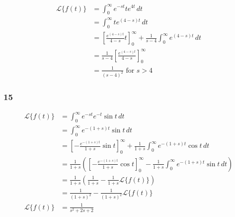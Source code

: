 \documentclass{article}
\begin{document}
\begin{align*}
  \mathcal{L}\{f(t)\} & = \int_0^\infty e^{-s t} t e^{4 t} \,dt                                                                    \\
                      & = \int_0^\infty t e^{(4 - s) t} \,dt                                                                       \\
                      & = \left[ \frac{e^{(4 - s) t}}{4 - s} t \right]_0^\infty + \frac{1}{s - 4} \int_0^\infty e^{(4 - s) t} \,dt \\
                      & = \frac{1}{s - 4} \left[ \frac{e^{(4 - s) t}}{4 - s} \right]_0^\infty                                      \\
                      & = \frac{1}{(s - 4)^2} \text{ for } s > 4
\end{align*}

\subsubsection{15}

\begin{align*}
  \mathcal{L}\{f(t)\} & = \int_0^\infty e^{-s t} e^{-t} \sin t \,dt                                                                                                              \\
                      & = \int_0^\infty e^{-(1 + s) t} \sin t \,dt                                                                                                               \\
                      & = \left[ -\frac{e^{-(1 + s) t}}{1 + s} \sin t \right]_0^\infty + \frac{1}{1 + s} \int_0^\infty e^{-(1 + s) t} \cos t \,dt                                \\
                      & = \frac{1}{1 + s} \left( \left[ -\frac{e^{-(1 + s) t}}{1 + s} \cos t \right]_0^\infty - \frac{1}{1 + s} \int_0^\infty e^{-(1 + s) t} \sin t \,dt \right) \\
                      & = \frac{1}{1 + s} \left( \frac{1}{1 + s} - \frac{1}{1 + s} \mathcal{L}\{f(t)\} \right)                                                                   \\
                      & = \frac{1}{(1 + s)^2} - \frac{1}{(1 + s)^2} \mathcal{L}\{f(t)\}                                                                                          \\
  \mathcal{L}\{f(t)\} & = \frac{1}{s^2 + 2 s + 2}
\end{align*}
\end{document}
